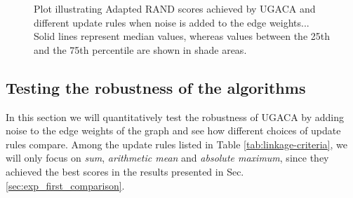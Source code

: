 \begin{figure}
\caption{Plot illustrating Adapted RAND scores achieved by UGACA and different update rules when noise is added to the edge weights... Solid lines represent median values, whereas values between the 25th and the 75th percentile are shown in shade areas.    }\label{fig:noise_plots}
\end{figure}





\subsection{Testing the robustness of the algorithms}
 In this section we will quantitatively test the robustness of UGACA by adding noise to the edge weights of the graph and see how different choices of update rules compare.
 Among the update rules listed in Table \ref{tab:linkage-criteria}, we will only focus on \emph{sum}, \emph{arithmetic mean} and \emph{absolute maximum}, since they achieved the best scores in the results presented in Sec. \ref{sec:exp_first_comparison}. %

